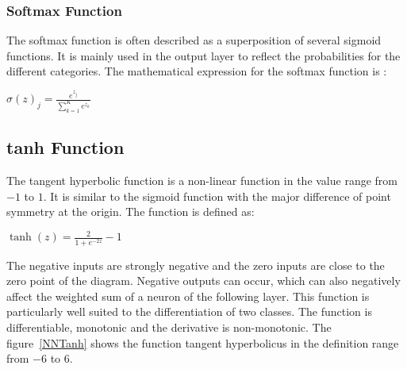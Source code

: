 \subsubsection{Softmax Function}

The softmax function is often described as a superposition of several sigmoid functions. It is mainly used in the output layer to reflect the probabilities for the different categories. The mathematical expression for the softmax function is \cite{Gupta:2020b}:

\begin{center}
$\sigma(z)_j = \frac{e^{z_j}}{\sum\nolimits_{k=1}^K e^{z_k}}$
\end{center}


\subsection{tanh Function}%

The tangent hyperbolic function is a non-linear function in the value range from $-1$ to $1$. It is similar to the sigmoid function with the major difference of point symmetry at the origin. The function is defined as:

\begin{center}
  $\tanh(z) = \frac{2}{1 + e^{-2z}} -1$
\end{center}

The negative inputs are strongly negative and the zero inputs are close to the zero point of the diagram. Negative outputs can occur, which can also negatively affect the weighted sum of a neuron of the following layer. This function is particularly well suited to the differentiation of two classes. The function is differentiable, monotonic and the derivative is non-monotonic. \cite{Gupta:2020b} The figure~\ref{NNTanh} shows the function tangent hyperbolicus in the definition range from $-6$ to $6$.

